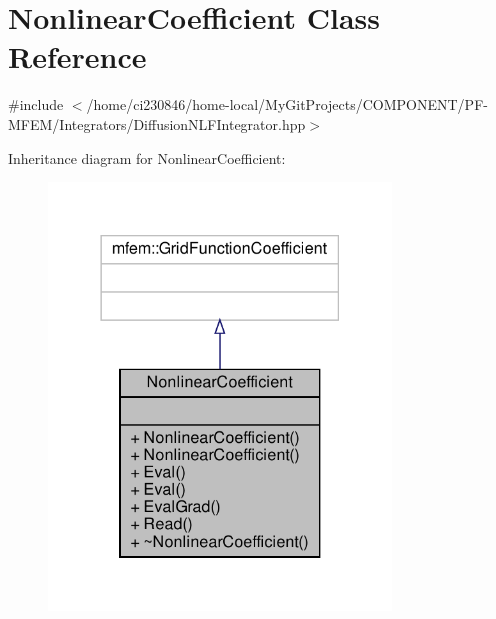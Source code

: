 \hypertarget{classNonlinearCoefficient}{}\section{Nonlinear\+Coefficient Class Reference}
\label{classNonlinearCoefficient}


{\ttfamily \#include $<$/home/ci230846/home-\/local/\+My\+Git\+Projects/\+C\+O\+M\+P\+O\+N\+E\+N\+T/\+P\+F-\/\+M\+F\+E\+M/\+Integrators/\+Diffusion\+N\+L\+F\+Integrator.\+hpp$>$}



Inheritance diagram for Nonlinear\+Coefficient\+:\nopagebreak
\begin{figure}[H]
\begin{center}
\leavevmode
\includegraphics[width=258pt]{classNonlinearCoefficient__inherit__graph}
\end{center}
\end{figure}


